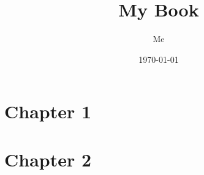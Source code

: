 \documentclass{book}
\begin{document}
\frontmatter
\title{My Book}
\author{Me}
\date{\today}
\maketitle

\tableofcontents

\mainmatter
\chapter{Chapter 1}


\chapter{Chapter 2}


\backmatter
\end{document}
